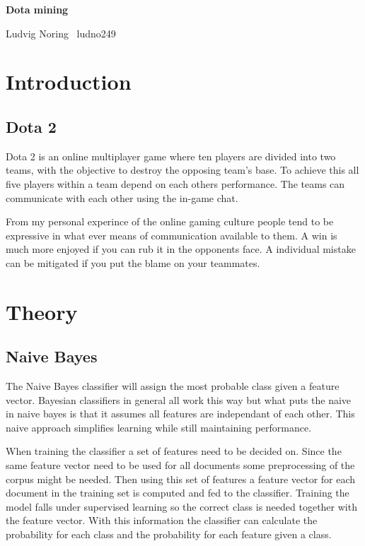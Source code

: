 \documentclass[12pt,a4paper]{article}
\begin{document}
\begin{center}
    \Huge
    \textbf{Dota mining}

    \vspace{0.3cm}
    \large
    Ludvig Noring \
    ludno249

\end{center}

\section{Introduction}
\subsection{Dota 2}
Dota 2 is an online multiplayer game where ten players are divided into two teams,
with the objective to destroy the opposing team's base.
To achieve this all five players within a team depend on each others performance.
The teams can communicate with each other using the in-game chat.

From my personal experince of the online gaming culture
people tend to be expressive in what ever means of communication available to them.
A win is much more enjoyed if you can rub it in the opponents face.
A individual mistake can be mitigated if you put the blame on your teammates.


\section{Theory}
\subsection{Naive Bayes}
The Naive Bayes classifier will assign the most probable class given a feature vector.
Bayesian classifiers in general all work this way but what puts the naive in naive bayes
is that it assumes all features are independant of each other.
This naive approach simplifies learning while still maintaining performance.

When training the classifier a set of features need to be decided on.
Since the same feature vector need to be used for all documents some preprocessing of the corpus
might be needed.
Then using this set of features a feature vector for each document in the training set is
computed and fed to the classifier.
Training the model falls under supervised learning so the correct class is needed together with the feature vector.
With this information the classifier can calculate the probability for each class and the probability for each feature given a class.
\end{document}
